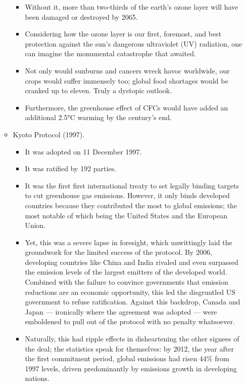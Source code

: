 \documentclass[oneside]{book}
\begin{document}
\begin{enumerate}
\begin{itemize}
\begin{itemize}
\begin{itemize}
            \end{itemize}
            \item Without it, more than two-thirds of the earth's ozone layer will have been damaged or destroyed by 2065. 
            \item Considering how the ozone layer is our first, foremost, and best protection against the sun's dangerous ultraviolet (UV) radiation, one can imagine the monumental catastrophe that awaited. 
            \item Not only would sunburns and cancers wreck havoc worldwide, our crops would suffer immensely too; global food shortages would be cranked up to eleven. Truly a dystopic outlook. 
            \item Furthermore, the greenhouse effect of CFCs would have added an additional 2.5°C warming by the century's end.
        \end{itemize}
        \item Kyoto Protocol (1997).
        \begin{itemize}
            \item It was adopted on 11 December 1997.
            \item It was ratified by 192 parties.
            \item It was the first first international treaty to set legally binding targets to cut greenhouse gas emissions. However, it only binds developed countries because they contributed the most to global emissions; the most notable of which being the United States and the European Union.
            \item Yet, this was a severe lapse in foresight, which unwittingly laid the groundwork for the limited success of the protocol. By 2006, developing countries like China and India rivaled and even surpassed the emission levels of the largest emitters of the developed world. Combined with the failure to convince governments that emission reductions are an economic opportunity, this led the disgruntled US government to refuse ratification. Against this backdrop, Canada and Japan --- ironically where the agreement was adopted --- were emboldened to pull out of the protocol with no penalty whatsoever.
            \item Naturally, this had ripple effects in disheartening the other signees of the deal; the statistics speak for themselves: by 2012, the year after the first commitment period, global emissions had risen 44\% from 1997 levels, driven predominantly by emissions growth in developing nations.

\end{itemize}
\end{itemize}
\end{enumerate}
\end{document}
